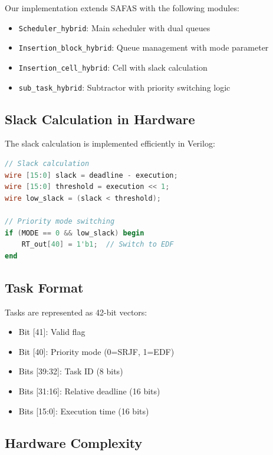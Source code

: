 \documentclass[conference]{IEEEtran}
\begin{document}
Our implementation extends SAFAS with the following modules:

\begin{itemize}
    \item \texttt{Scheduler\_hybrid}: Main scheduler with dual queues
    \item \texttt{Insertion\_block\_hybrid}: Queue management with mode parameter
    \item \texttt{Insertion\_cell\_hybrid}: Cell with slack calculation
    \item \texttt{sub\_task\_hybrid}: Subtractor with priority switching logic
\end{itemize}

\subsection{Slack Calculation in Hardware}

The slack calculation is implemented efficiently in Verilog:

\begin{lstlisting}[language=Verilog, basicstyle=\footnotesize\ttfamily]
// Slack calculation
wire [15:0] slack = deadline - execution;
wire [15:0] threshold = execution << 1;
wire low_slack = (slack < threshold);

// Priority mode switching
if (MODE == 0 && low_slack) begin
    RT_out[40] = 1'b1;  // Switch to EDF
end
\end{lstlisting}

\subsection{Task Format}

Tasks are represented as 42-bit vectors:
\begin{itemize}
    \item Bit [41]: Valid flag
    \item Bit [40]: Priority mode (0=SRJF, 1=EDF)
    \item Bits [39:32]: Task ID (8 bits)
    \item Bits [31:16]: Relative deadline (16 bits)
    \item Bits [15:0]: Execution time (16 bits)
\end{itemize}

\subsection{Hardware Complexity}
\end{document}
